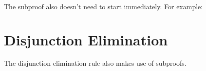 The subproof also doesn't need to start immediately. For example:
\begin{pf}
	\open
	\close
\end{pf}
%
%
%


\section{Disjunction Elimination}\label{s:orE}
The disjunction elimination rule also makes use of subproofs.

